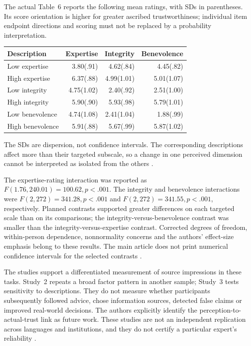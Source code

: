 The actual Table~6 reports the following mean ratings, with SDs in
parentheses. Its score orientation is higher for greater ascribed
trustworthiness; individual item endpoint directions and scoring must
not be replaced by a probability interpretation.
\begin{center}
\begin{tabular}{lrrr}
\toprule
Description & Expertise & Integrity & Benevolence\\
\midrule
Low expertise &3.80(.91)&4.62(.84)&4.45(.82)\\
High expertise &6.37(.88)&4.99(1.01)&5.01(1.07)\\
Low integrity &4.75(1.02)&2.40(.92)&2.51(1.00)\\
High integrity &5.90(.90)&5.93(.98)&5.79(1.01)\\
Low benevolence &4.74(1.08)&2.41(1.04)&1.88(.99)\\
High benevolence &5.91(.88)&5.67(.99)&5.87(1.02)\\
\bottomrule
\end{tabular}
\end{center}
The SDs are dispersion, not confidence intervals. The corresponding
descriptions affect more than their targeted subscale, so a change in
one perceived dimension cannot be interpreted as isolated from the others
\cite[p.~13]{HendriksKienhuesBromme2015METI}.

The expertise-rating interaction was reported as
\(F(1.76,240.01)=100.62,p<.001\). The integrity and benevolence
interactions were \(F(2,272)=341.28,p<.001\) and
\(F(2,272)=341.55,p<.001\), respectively. Planned contrasts
supported greater differences on each targeted scale than on its
comparisons; the integrity-versus-benevolence contrast was smaller than
the integrity-versus-expertise contrast. Corrected degrees of freedom,
within-person dependence, nonnormality concerns and the authors'
effect-size emphasis belong to these results. The main article does
not print numerical confidence intervals for the selected contrasts
\cite[pp.~11--15]{HendriksKienhuesBromme2015METI}.

The studies support a differentiated measurement of source impressions
in these tasks. Study~2 repeats a broad factor pattern in another sample;
Study~3 tests sensitivity to descriptions. They do not measure whether
participants subsequently followed advice, chose information sources,
detected false claims or improved real-world decisions. The authors
explicitly identify the perception-to-actual-trust link as future work.
These studies are not an independent replication across languages and
institutions, and they do not certify a particular expert's reliability
\cite[pp.~16--17]{HendriksKienhuesBromme2015METI}.

